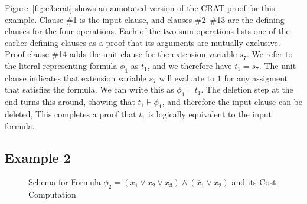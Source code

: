 \documentclass{llncs}
\newcommand{\tautology}{1}
\newcommand{\obar}[1]{\overline{#1}}
\newcommand{\turnstile}{\vdash}
\begin{document}
Figure~\ref{fig:c3:crat} shows an annotated version of the CRAT proof
for this example.  Clause \#1
is the input clause, and
clauses \#2--\#13 are the defining clauses for the four operations.
Each of the two sum operations lists one of the earlier defining
clauses as a proof that its arguments are mutually exclusive.
Proof clause \#14 adds the unit clause for the extension variable $s_7$.
We refer to the literal representing formula $\phi_1$ as $t_1$,
and we therefore have $t_1 = s_7$.
The unit clause indicates that extension variable $s_7$ will evaluate to
$\tautology$  for any assigment that satisfies the formula.  We
can write this as $\phi_1 \turnstile t_1$.  The
deletion step at the end turns this around, showing that
$t_1 \turnstile \phi_1$,
and therefore the input clause can be deleted, This
completes a proof that $t_1$ is logically
equivalent to the input formula.

\subsection{Example 2}

\begin{figure}
\caption{Schema for Formula $\phi_2 = (x_1 \lor x_2 \lor x_3) \land (\obar{x}_1 \lor x_2)$ and its Cost Computation}
\label{fig:p2:schema}
\end{figure}
\end{document}
